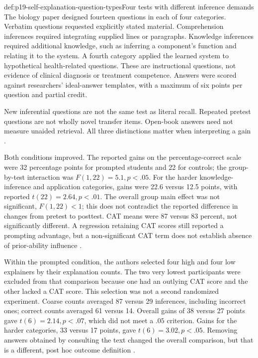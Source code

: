 \begin{hbdefinition}{def:p19-self-explanation-question-types}{Four tests with different inference demands}
The biology paper designed fourteen questions in each of four categories.
Verbatim questions requested explicitly stated material. Comprehension
inferences required integrating supplied lines or paragraphs. Knowledge
inferences required additional knowledge, such as inferring a component's
function and relating it to the system. A fourth category applied the
learned system to hypothetical health-related questions. These are
instructional questions, not evidence of clinical diagnosis or treatment
competence. Answers were scored against researchers' ideal-answer templates,
with a maximum of six points per question and partial credit.

New inferential questions are not the same test as literal recall. Repeated
pretest questions are not wholly novel transfer items. Open-book answers
need not measure unaided retrieval. All three distinctions matter when
interpreting a gain
\cite[pp.~447--452]{ChiEtAl1994Eliciting}.
\end{hbdefinition}

Both conditions improved. The reported gains on the percentage-correct
scale were 32 percentage points for prompted students and 22 for controls;
the group-by-test interaction was \(F(1,22)=5.1,p<.05\). For the harder
knowledge-inference and application categories, gains were 22.6 versus
12.5 points, with reported \(t(22)=2.64,p<.01\). The overall group main
effect was not significant, \(F(1,22)<1\); this does not contradict the
reported difference in changes from pretest to posttest. CAT means were
87 versus 83 percent, not significantly different. A regression retaining
CAT scores still reported a prompting advantage, but a non-significant
CAT term does not establish absence of prior-ability influence
\cite[pp.~452--454, Figures~2--3]{ChiEtAl1994Eliciting}.

Within the prompted condition, the authors selected four high and four low
explainers by their explanation counts. The two very lowest participants
were excluded from that comparison because one had an outlying CAT score
and the other lacked a CAT score. This selection was not a second randomized
experiment. Coarse counts averaged 87 versus 29 inferences, including
incorrect ones; correct counts averaged 61 versus 14. Overall gains of
38 versus 27 points gave \(t(6)=2.14,p<.07\), which did not meet a
\(.05\) criterion. Gains for the harder categories, 33 versus 17 points,
gave \(t(6)=3.02,p<.05\). Removing answers obtained by consulting the
text changed the overall comparison, but that is a different, post hoc
outcome definition
\cite[pp.~457--459]{ChiEtAl1994Eliciting}.

